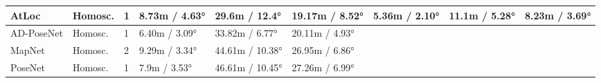 \documentclass[10pt,twocolumn,letterpaper]{article}
\begin{document}
\begin{table*}[!t]
\begin{tabular}{|l|l|l|l|l|l|l|l|l|}
AtLoc                & Homosc.            & 1               & 8.73m / 4.63°                         & \cellcolor[HTML]{FFC000}29.6m / 12.4° & \cellcolor[HTML]{FFC000}19.17m / 8.52° & \cellcolor[HTML]{FFC000}5.36m / 2.10°                 & \cellcolor[HTML]{FFC000}11.1m / 5.28°                 & \cellcolor[HTML]{FFC000}8.23m / 3.69° \\ \hline
AD-PoseNet         & Homosc.            & 1               & \cellcolor[HTML]{FFC000}6.40m / 3.09° & 33.82m / 6.77°                        & 20.11m / 4.93°                         &                               &                               &                                       \\ \hline
MapNet               & Homosc.            & 2               & 9.29m / 3.34°                         & 44.61m / 10.38°                       & 26.95m / 6.86°                         &                               &                               &                                       \\ \hline
PoseNet              & Homosc.            & 1               & 7.9m / 3.53°                          & 46.61m / 10.45°                       & 27.26m / 6.99°                         &                               &                               &                                       \\ \hline
\end{tabular}

\vspace{1mm}
\end{table*} 
\end{document}
